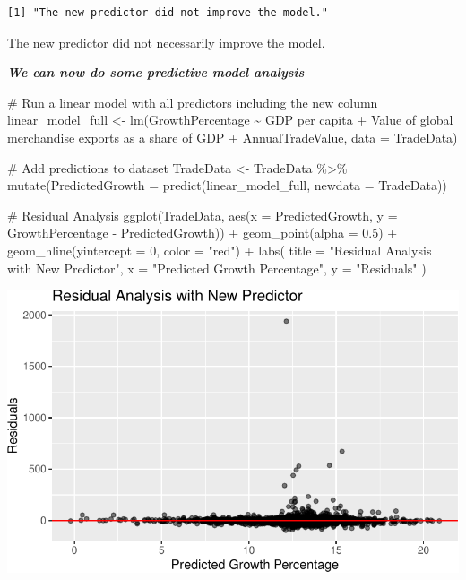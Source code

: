 \documentclass[
  10pt,
]{article}
\newenvironment{Shaded}{\begin{snugshade}}{\end{snugshade}}
\newcommand{\AttributeTok}[1]{\textcolor[rgb]{0.40,0.45,0.13}{#1}}
\newcommand{\CommentTok}[1]{\textcolor[rgb]{0.37,0.37,0.37}{#1}}
\newcommand{\DecValTok}[1]{\textcolor[rgb]{0.68,0.00,0.00}{#1}}
\newcommand{\FloatTok}[1]{\textcolor[rgb]{0.68,0.00,0.00}{#1}}
\newcommand{\FunctionTok}[1]{\textcolor[rgb]{0.28,0.35,0.67}{#1}}
\newcommand{\NormalTok}[1]{\textcolor[rgb]{0.00,0.23,0.31}{#1}}
\newcommand{\OtherTok}[1]{\textcolor[rgb]{0.00,0.23,0.31}{#1}}
\newcommand{\SpecialCharTok}[1]{\textcolor[rgb]{0.37,0.37,0.37}{#1}}
\newcommand{\StringTok}[1]{\textcolor[rgb]{0.13,0.47,0.30}{#1}}
\begin{document}
\begin{verbatim}
[1] "The new predictor did not improve the model."
\end{verbatim}

The new predictor did not necessarily improve the model.

\textbf{\emph{We can now do some predictive model analysis}}

\begin{Shaded}
\begin{Highlighting}[]
\CommentTok{\# Run a linear model with all predictors including the new column}
\NormalTok{linear\_model\_full }\OtherTok{\textless{}{-}} \FunctionTok{lm}\NormalTok{(GrowthPercentage }\SpecialCharTok{\textasciitilde{}} \StringTok{\textasciigrave{}}\AttributeTok{GDP per capita}\StringTok{\textasciigrave{}} \SpecialCharTok{+} \StringTok{\textasciigrave{}}\AttributeTok{Value of global merchandise exports as a share of GDP}\StringTok{\textasciigrave{}} \SpecialCharTok{+}\NormalTok{ AnnualTradeValue, }\AttributeTok{data =}\NormalTok{ TradeData)}

\CommentTok{\# Add predictions to dataset}
\NormalTok{TradeData }\OtherTok{\textless{}{-}}\NormalTok{ TradeData }\SpecialCharTok{\%\textgreater{}\%}
  \FunctionTok{mutate}\NormalTok{(}\AttributeTok{PredictedGrowth =} \FunctionTok{predict}\NormalTok{(linear\_model\_full, }\AttributeTok{newdata =}\NormalTok{ TradeData))}

\CommentTok{\# Residual Analysis}
\FunctionTok{ggplot}\NormalTok{(TradeData, }\FunctionTok{aes}\NormalTok{(}\AttributeTok{x =}\NormalTok{ PredictedGrowth, }\AttributeTok{y =}\NormalTok{ GrowthPercentage }\SpecialCharTok{{-}}\NormalTok{ PredictedGrowth)) }\SpecialCharTok{+}
  \FunctionTok{geom\_point}\NormalTok{(}\AttributeTok{alpha =} \FloatTok{0.5}\NormalTok{) }\SpecialCharTok{+}
  \FunctionTok{geom\_hline}\NormalTok{(}\AttributeTok{yintercept =} \DecValTok{0}\NormalTok{, }\AttributeTok{color =} \StringTok{"red"}\NormalTok{) }\SpecialCharTok{+}
  \FunctionTok{labs}\NormalTok{(}
    \AttributeTok{title =} \StringTok{"Residual Analysis with New Predictor"}\NormalTok{,}
    \AttributeTok{x =} \StringTok{"Predicted Growth Percentage"}\NormalTok{,}
    \AttributeTok{y =} \StringTok{"Residuals"}
\NormalTok{  )}
\end{Highlighting}
\end{Shaded}

\includegraphics{draft_1_files/figure-pdf/unnamed-chunk-20-1.pdf}
\end{document}
